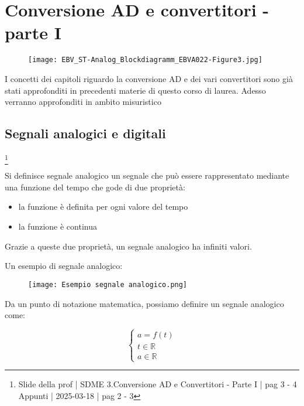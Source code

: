 \chapter{Conversione AD e convertitori - parte I}

\begin{figure}[h]
    \centering
    \texttt{[image: EBV\_ST-Analog\_Blockdiagramm\_EBVA022-Figure3.jpg]}
\end{figure}

\newpage 

\begin{tcolorbox}
    I concetti dei capitoli riguardo la conversione AD e dei vari convertitori sono già stati approfonditi in precedenti materie di questo corso di laurea. \newline 
    Adesso verranno approfonditi in ambito misuristico    
\end{tcolorbox}

\section{Segnali analogici e digitali}
\footnote{Slide della prof | SDME 3.Conversione AD e Convertitori - Parte I | pag 3 - 4 \\  
Appunti | 2025-03-18 | pag 2 - 3}

Si definisce segnale analogico un segnale che può essere rappresentato mediante una funzione del tempo che gode di due proprietà: 

\begin{itemize}
    \item la funzione è definita per ogni valore del tempo 
    \item la funzione è continua
\end{itemize}

Grazie a queste due proprietà, un segnale analogico ha infiniti valori. \newline 

Un esempio di segnale analogico: 

\begin{figure}[h]
    \centering
    \texttt{[image: Esempio segnale analogico.png]}
\end{figure}

Da un punto di notazione matematica, possiamo definire un segnale analogico come: 

{
    \Large 
    \begin{equation}
        \begin{cases}
            a = f(t) 
            \\ 
            t \in \mathbb{R}
            \\ 
            a \in \mathbb{R}
        \end{cases}
    \end{equation}
} 


